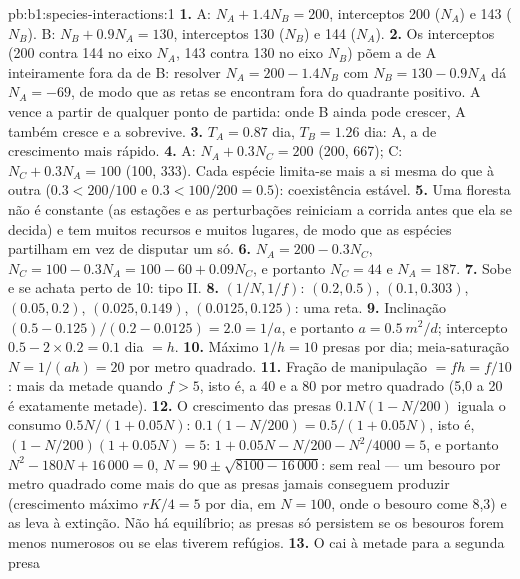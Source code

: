 \begin{solution}{pb:b1:species-interactions:1}
\textbf{1.} A: $N_A + 1.4 N_B = 200$, interceptos 200 ($N_A$) e 143
($N_B$). B: $N_B + 0.9 N_A = 130$, interceptos 130 ($N_B$) e 144
($N_A$).
\textbf{2.} Os interceptos (200 contra 144 no eixo $N_A$, 143 contra
130 no eixo $N_B$) põem a  de A inteiramente fora da de B:
resolver $N_A = 200 - 1.4 N_B$ com $N_B = 130 - 0.9 N_A$ dá $N_A = -69$,
de modo que as retas se encontram fora do quadrante positivo. A vence
a partir de qualquer ponto de partida: onde B ainda pode crescer, A
também cresce e a sobrevive.
\textbf{3.} $T_A = 0.87$ dia, $T_B = 1.26$ dia: A, a de crescimento
mais rápido.
\textbf{4.} A: $N_A + 0.3 N_C = 200$ (200, 667); C: $N_C + 0.3 N_A =
100$ (100, 333). Cada espécie limita-se mais a si mesma do que à outra
($0.3 < 200/100$ e $0.3 < 100/200 = 0.5$): coexistência estável.
\textbf{5.} Uma floresta não é constante (as estações e as
perturbações reiniciam a corrida antes que ela se decida) e tem muitos
recursos e muitos lugares, de modo que as espécies partilham  em
vez de disputar um só.
\textbf{6.} $N_A = 200 - 0.3 N_C$, $N_C = 100 - 0.3 N_A = 100 - 60 +
0.09 N_C$, e portanto $N_C = 44$ e $N_A = 187$.
\textbf{7.} Sobe e se achata perto de 10: tipo II.
\textbf{8.} $(1/N, 1/f)$: $(0.2, 0.5)$, $(0.1, 0.303)$, $(0.05, 0.2)$,
$(0.025, 0.149)$, $(0.0125, 0.125)$: uma reta.
\textbf{9.} Inclinação $(0.5 - 0.125)/(0.2 - 0.0125) = 2.0 = 1/a$, e
portanto $a =
\qty{0.5}{m^2/d}$; intercepto $0.5 - 2\times 0.2 = 0.1$ dia $= h$.
\textbf{10.} Máximo $1/h = 10$ presas por dia; meia-saturação $N =
1/(ah) = 20$ por metro quadrado.
\textbf{11.} Fração de manipulação $= f h = f/10$: mais da metade
quando $f
> 5$, isto é, a 40 e a 80 por metro quadrado (5,0 a 20 é exatamente
metade).
\textbf{12.} O crescimento das presas $0.1 N (1 - N/200)$ iguala o
consumo $0.5N/(1 + 0.05N)$: $0.1(1 - N/200) = 0.5/(1 + 0.05 N)$, isto
é, $(1 - N/200)(1 + 0.05N) = 5$: $1 + 0.05N - N/200 - N^2/4000 = 5$, e
portanto $N^2 - 180 N + 16\,000 = 0$, $N = 90 \pm \sqrt{8100 - 16\,000}$:
sem  real --- um besouro por metro quadrado come mais do que as
presas jamais conseguem produzir (crescimento máximo $rK/4 = 5$ por
dia, em $N = 100$, onde o besouro come 8,3) e as leva à extinção. Não
há equilíbrio; as presas só persistem se os besouros forem menos
numerosos ou se elas tiverem refúgios.
\textbf{13.} O  cai à metade para a segunda presa

\end{solution}
